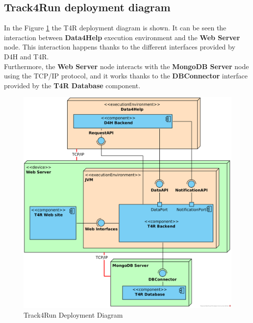 \documentclass[a4paper, hidelinks, 12pt]{report}
\begin{document}
	\subsection{Track4Run deployment diagram}
	In the Figure \ref{fig:t4r_deployment_diagram} the T4R deployment diagram is shown. It can be seen the interaction between \textbf{Data4Help} execution environment and the \textbf{Web Server} node. This interaction happens thanks to the different interfaces provided by D4H and T4R. \\
	Furthermore, the \textbf{Web Server} node interacts with the \textbf{MongoDB Server} node using the TCP/IP protocol, and it works thanks to the \textbf{DBConnector} interface provided by the \textbf{T4R Database} component. \\
	
		\begin{figure}[H]
			\centering
			\includegraphics[width=1\textwidth]{diagrams/t4r_deployment_diagram.png}
			\caption[Track4Run Deployment Diagram]{Track4Run Deployment Diagram}
			\label{fig:t4r_deployment_diagram}
		\end{figure}	
		
\end{document}
